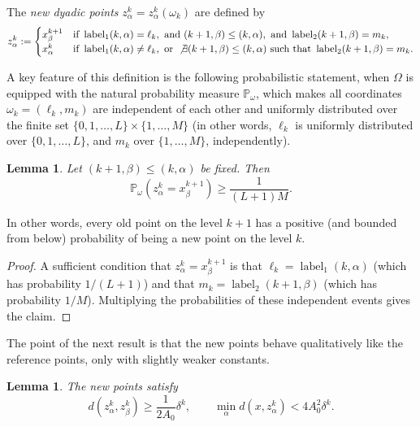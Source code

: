\documentclass{amsart}
\numberwithin{equation}{section}
\theoremstyle{plain}
\newtheorem{lemma}[equation]{Lemma}
\theoremstyle{definition}
\theoremstyle{remark}
\begin{document}
{{The \emph{new dyadic points} $z^k_{\alpha}=z^k_{\alpha}(\omega_k)$ are defined by
\begin{equation*}
  z^k_{\alpha}:=\begin{cases}  x^{k+1}_{\beta} & \text{if }\operatorname{label}_1(k,\alpha)=\ell_k,\text{ and } (k+1,\beta)\leq(k,\alpha),\text{ and }\operatorname{label}_2(k+1,\beta)=m_k, \\
    x^k_{\alpha} &  \text{if }\operatorname{label}_1(k,\alpha)\neq\ell_k,\text{ or } \not\exists(k+1,\beta)\leq(k,\alpha)
    \text{ such that }\operatorname{label}_2(k+1,\beta)=m_k. \\
    \end{cases}
\end{equation*}

A key feature of this definition is the following probabilistic statement, when $\Omega$ is equipped with the natural probability measure $\mathbb{P}_\omega$, which makes all coordinates $\omega_k=(\ell_k,m_k)$ are independent of each other and uniformly distributed over the finite set $\{0,1,\ldots,L\}\times\{1,\ldots,M\}$ (in other words, $\ell_k$ is uniformly distributed over $\{0,1,\ldots,L\}$, and $m_k$ over $\{1,\ldots,M\}$, independently).

\begin{lemma}\label{lem:prob}
Let $(k+1,\beta)\leq(k,\alpha)$ be fixed. Then
\begin{equation*}
  \mathbb{P}_\omega( z^k_\alpha=x^{k+1}_\beta )\geq\frac{1}{(L+1)M}.
\end{equation*}
\end{lemma}

In other words, every old point on the level $k+1$ has a positive (and bounded from below) probability of being a new point on the level $k$.

\begin{proof}
A sufficient condition that $ z^k_\alpha=x^{k+1}_\beta$ is that $\ell_k=\operatorname{label}_1(k,\alpha)$ (which has probability $1/(L+1)$) and that $m_k=\operatorname{label}_2(k+1,\beta)$ (which has probability $1/M$). Multiplying the probabilities of these independent events gives the claim.
\end{proof}

The point of the next result is that the new points behave qualitatively like the reference points, only with slightly weaker constants.

\begin{lemma}
The new points satisfy
\begin{equation*}
  d(z^k_{\alpha},z^k_{\beta})\geq\frac{1}{2A_0}\delta^k,\qquad\min_{\alpha}d(x,z^k_{\alpha})<4A_0^2\delta^k.
\end{equation*}
\end{lemma}

}}
\end{document}
